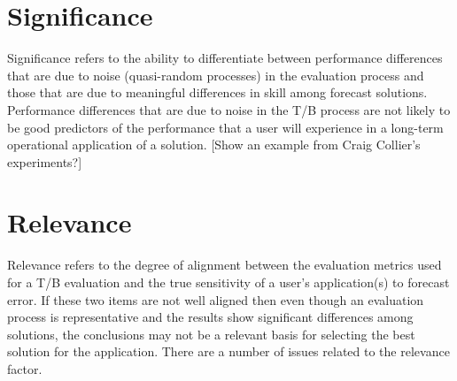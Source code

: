 \section{Significance}

Significance refers to the ability to differentiate between performance differences that are due to noise (quasi-random processes) in the evaluation process and those that are due to meaningful differences in skill among forecast solutions. Performance differences that are due to noise in the T/B process are not likely to be good predictors of the performance that a user will experience in a long-term operational application of a solution.
[Show an example from Craig Collier’s experiments?]

\section{Relevance} %

Relevance refers to the degree of alignment between the evaluation metrics used for a T/B evaluation and the true sensitivity of a user’s application(s) to forecast error. If these two items are not well aligned then even though an evaluation process is representative and the results show significant differences among solutions, the conclusions may not be a relevant basis for selecting the best solution for the application. There are a number of issues related to the relevance factor.

